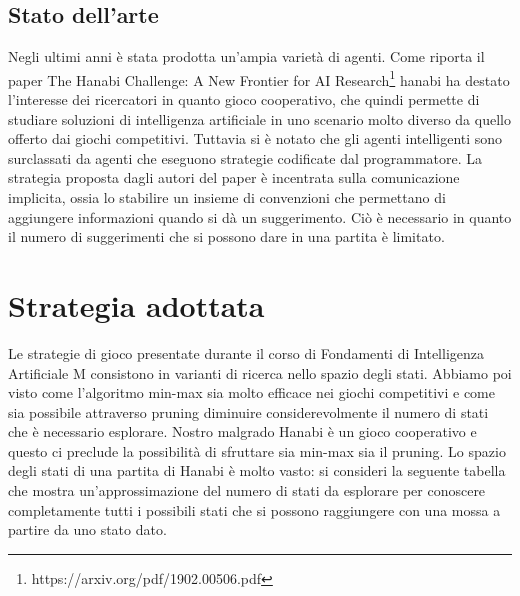 \documentclass{article}
\begin{document}
\subsection{Stato dell'arte}
Negli ultimi anni è stata prodotta un'ampia varietà di agenti. Come riporta il paper The Hanabi Challenge: A New Frontier for AI Research\footnote{ https://arxiv.org/pdf/1902.00506.pdf} hanabi ha destato l'interesse dei ricercatori in quanto gioco cooperativo, che quindi permette di studiare soluzioni di intelligenza artificiale in uno scenario molto diverso da quello offerto dai giochi competitivi.
Tuttavia si è notato che gli agenti intelligenti sono surclassati da agenti che eseguono strategie codificate dal programmatore.\newline
\newline
La strategia proposta dagli autori del paper è incentrata sulla comunicazione implicita, ossia lo stabilire un insieme di convenzioni che permettano di aggiungere informazioni quando si dà un suggerimento. Ciò è necessario in quanto il numero di suggerimenti che si possono dare in una partita è limitato.

\section{Strategia adottata}
\begin{flushleft}
Le strategie di gioco presentate durante il corso di Fondamenti di Intelligenza Artificiale M consistono in varianti di ricerca nello spazio degli stati.\newline
Abbiamo poi visto come l'algoritmo min-max sia molto efficace nei giochi competitivi e come sia possibile attraverso pruning diminuire considerevolmente il numero di stati che è necessario esplorare.\newline
\newline
Nostro malgrado Hanabi è un gioco cooperativo e questo ci preclude la possibilità di sfruttare sia min-max sia il pruning. \newline
Lo spazio degli stati di una partita di Hanabi è molto vasto: si consideri la seguente tabella che mostra un'approssimazione del numero di stati da esplorare per conoscere completamente tutti i possibili stati che si possono raggiungere con una mossa a partire da uno stato dato.
\end{flushleft}
\end{document}

